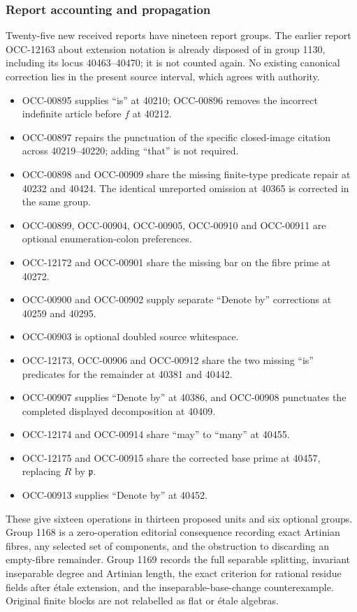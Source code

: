 \subsubsection{Report accounting and propagation}\label{algebra-proof-053-report-accounting-and-propagation}

Twenty-five new received reports have nineteen report groups. The earlier report OCC-12163 about extension notation is already disposed of in group 1130, including its locus 40463--40470; it is not counted again. No existing canonical correction lies in the present source interval, which agrees with authority.

\begin{itemize}
\tightlist
\item
  OCC-00895 supplies ``is'' at 40210; OCC-00896 removes the incorrect indefinite article before \(f\) at 40212.
\item
  OCC-00897 repairs the punctuation of the specific closed-image citation across 40219--40220; adding ``that'' is not required.
\item
  OCC-00898 and OCC-00909 share the missing finite-type predicate repair at 40232 and 40424. The identical unreported omission at 40365 is corrected in the same group.
\item
  OCC-00899, OCC-00904, OCC-00905, OCC-00910 and OCC-00911 are optional enumeration-colon preferences.
\item
  OCC-12172 and OCC-00901 share the missing bar on the fibre prime at 40272.
\item
  OCC-00900 and OCC-00902 supply separate ``Denote by'' corrections at 40259 and 40295.
\item
  OCC-00903 is optional doubled source whitespace.
\item
  OCC-12173, OCC-00906 and OCC-00912 share the two missing ``is'' predicates for the remainder at 40381 and 40442.
\item
  OCC-00907 supplies ``Denote by'' at 40386, and OCC-00908 punctuates the completed displayed decomposition at 40409.
\item
  OCC-12174 and OCC-00914 share ``may'' to ``many'' at 40455.
\item
  OCC-12175 and OCC-00915 share the corrected base prime at 40457, replacing \(R\) by \(\mathfrak p\).
\item
  OCC-00913 supplies ``Denote by'' at 40452.
\end{itemize}

These give sixteen operations in thirteen proposed units and six optional groups. Group 1168 is a zero-operation editorial consequence recording exact Artinian fibres, any selected set of components, and the obstruction to discarding an empty-fibre remainder. Group 1169 records the full separable splitting, invariant inseparable degree and Artinian length, the exact criterion for rational residue fields after étale extension, and the inseparable-base-change counterexample. Original finite blocks are not relabelled as flat or étale algebras.

